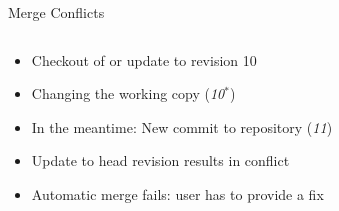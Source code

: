 \begin{frame}[fragile]{Merge Conflicts}
\begin{columns}[T, onlytextwidth]
\begin{column}{0.6\linewidth}
			\begin{example}{}
				\begin{itemize}
					\item<1-> Checkout of or update to revision 10
					\item<2-> Changing the working copy (\emph{10$^*$})
					\item<3-> In the meantime: New commit to repository (\emph{11})
					\item<4-> Update to head revision results in conflict
					\item<4-> Automatic merge fails: user has to provide a fix
				\end{itemize}			
			\end{example}
		\end{column}
		\begin{column}{0.5\linewidth}
		\end{column}
	\end{columns}
\end{frame}
